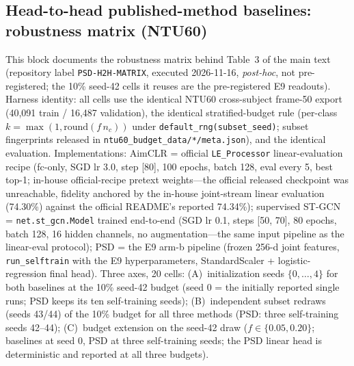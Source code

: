 \documentclass[11pt,a4paper]{article}
\begin{document}
\subsection{Head-to-head published-method baselines: robustness matrix (NTU60)}\label{app:h2hmatrix}
This block documents the robustness matrix behind Table~3 of the main text (repository label \texttt{PSD-H2H-MATRIX}, executed 2026-11-16, \emph{post-hoc}, not pre-registered; the 10\% seed-42 cells it reuses are the pre-registered E9 readouts). Harness identity: all cells use the identical NTU60 cross-subject frame-50 export (40,091 train / 16,487 validation), the identical stratified-budget rule (per-class $k{=}\max(1,\mathrm{round}(f\,n_c))$ under \texttt{default\_rng(subset\_seed)}; subset fingerprints released in \texttt{ntu60\_budget\_data/*/meta.json}), and the identical evaluation. Implementations: AimCLR = official \texttt{LE\_Processor} linear-evaluation recipe (fc-only, SGD lr 3.0, step [80], 100 epochs, batch 128, eval every 5, best top-1; in-house official-recipe pretext weights---the official released checkpoint was unreachable, fidelity anchored by the in-house joint-stream linear evaluation (74.30\%) against the official README's reported 74.34\%); supervised ST-GCN = \texttt{net.st\_gcn.Model} trained end-to-end (SGD lr 0.1, steps [50, 70], 80 epochs, batch 128, 16 hidden channels, no augmentation---the same input pipeline as the linear-eval protocol); PSD = the E9 arm-b pipeline (frozen 256-d joint features, \texttt{run\_selftrain} with the E9 hyperparameters, StandardScaler + logistic-regression final head). Three axes, 20 cells: (A)~initialization seeds $\{0,\dots,4\}$ for both baselines at the 10\% seed-42 budget (seed 0 = the initially reported single runs; PSD keeps its ten self-training seeds); (B)~independent subset redraws (seeds 43/44) of the 10\% budget for all three methods (PSD: three self-training seeds 42--44); (C)~budget extension on the seed-42 draw ($f\in\{0.05,0.20\}$; baselines at seed 0, PSD at three self-training seeds; the PSD linear head is deterministic and reported at all three budgets).
\end{document}
